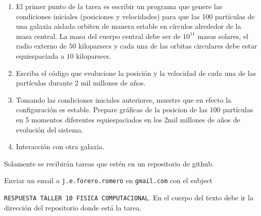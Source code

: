 \documentclass{article}
\begin{document}
\begin{enumerate}
\item El primer punto de la tarea es escribir un programa que genere
  las condiciones  iniciales (posiciones y velocidades) para que las
  100 part\'iculas de una galaxia aislada   orbiten de manera estable
  en c\'irculos alrededor de la masa  central. La masa del cuerpo
  central debe ser de $10^{11}$ masas solares, el radio externo de
  $50$ kiloparsecs y cada una de las orbitas circulares debe estar
  equiespaciada a $10$ kiloparsecs.  
\item 
  Escriba el c\'odigo que evolucione la posici\'on y la velocidad de
  cada una de las part\'iculas durante 2 mil millones de
  a\~nos. 
\item 
  Tomando las condiciones iniciales anteriores, muestre que en efecto
  la configuraci\'on es estable. Prepare gr\'aficas de la posicion de
  las 100 part\'iculas en 5 momentos diferentes equiespaciados en los
  2mil millones de a\~nos de evoluci\'on del sistema.

\item 
  Interacci\'on con otra galaxia.
\end{enumerate}


Solamente se recibir\'an tareas que est\'en en un repositorio de
github. 

Enviar un email a {\tt  j.e.forero.romero} en {\tt gmail.com} con el
subject


\verb"RESPUESTA TALLER 10 FISICA COMPUTACIONAL". En el cuerpo del texto
debe ir la direcci\'on del repositorio donde est\'a la tarea.  
\end{document}
